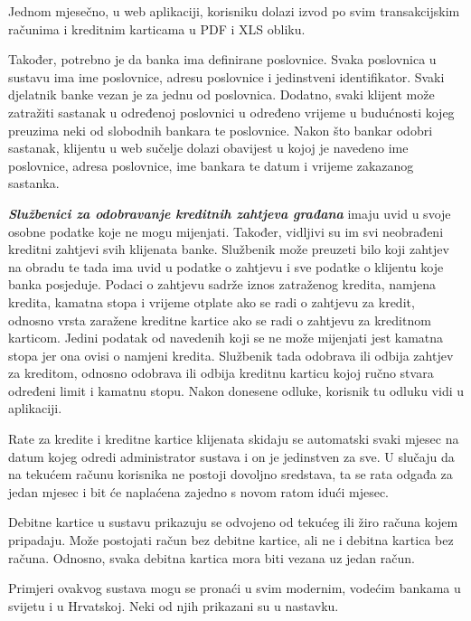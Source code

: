 		Jednom mjesečno, u web aplikaciji, korisniku dolazi izvod po svim transakcijskim računima i kreditnim karticama u PDF i XLS obliku.
		
		Također, potrebno je da banka ima definirane poslovnice. Svaka poslovnica u sustavu ima ime poslovnice, adresu poslovnice i jedinstveni identifikator. Svaki djelatnik banke vezan je za jednu od poslovnica. Dodatno, svaki klijent može zatražiti sastanak u određenoj poslovnici u određeno vrijeme u budućnosti kojeg preuzima neki od slobodnih bankara te poslovnice. Nakon što bankar odobri sastanak, klijentu u web sučelje dolazi obavijest u kojoj je navedeno ime poslovnice, adresa poslovnice, ime bankara te datum i vrijeme zakazanog sastanka.
		
		\textit{\textbf{Službenici za odobravanje kreditnih zahtjeva građana}} imaju uvid u svoje osobne podatke koje ne mogu mijenjati. Također, vidljivi su im svi neobrađeni kreditni zahtjevi svih klijenata banke. Službenik može preuzeti bilo koji zahtjev na obradu te tada ima uvid u podatke o zahtjevu i sve podatke o klijentu koje banka posjeduje. Podaci o zahtjevu sadrže iznos zatraženog kredita, namjena kredita, kamatna stopa i vrijeme otplate ako se radi o zahtjevu za kredit, odnosno vrsta zaražene kreditne kartice ako se radi o zahtjevu za kreditnom karticom. Jedini podatak od navedenih koji se ne može mijenjati jest kamatna stopa jer ona ovisi o namjeni kredita. Službenik tada odobrava ili odbija zahtjev za kreditom, odnosno odobrava ili odbija kreditnu karticu kojoj ručno stvara određeni limit i kamatnu stopu.
		Nakon donesene odluke, korisnik tu odluku vidi u aplikaciji.
		
		Rate za kredite i kreditne kartice klijenata skidaju se automatski svaki mjesec na datum kojeg odredi administrator sustava i on je jedinstven za sve. U slučaju da na tekućem računu korisnika ne postoji dovoljno sredstava, ta se rata odgađa za jedan mjesec i bit će naplaćena zajedno s novom ratom idući mjesec.
		
		Debitne kartice u sustavu prikazuju se odvojeno od tekućeg ili žiro računa kojem pripadaju. Može postojati račun bez debitne kartice, ali ne i debitna kartica bez računa. Odnosno, svaka debitna kartica mora biti vezana uz jedan račun.
		
		Primjeri ovakvog sustava mogu se pronaći u svim modernim, vodećim bankama u svijetu i u Hrvatskoj. Neki od njih prikazani su u nastavku.
		
